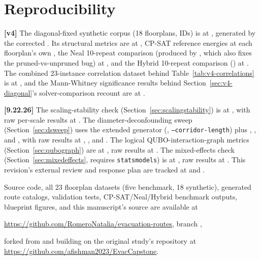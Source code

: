 \documentclass[11pt]{article}
\begin{document}
\section{Reproducibility}
\textbf{[v4]} The diagonal-fixed synthetic corpus (18 floorplans,  IDs) is at , generated by the corrected . Its structural metrics are at , CP-SAT reference energies at each floorplan's own , the Neal 10-repeat comparison (produced by , which also fixes the pruned-vs-unpruned bug) at , and the Hybrid 10-repeat comparison () at . The combined 23-instance correlation dataset behind Table~\ref{tab:v4-correlations} is at , and the Mann-Whitney significance results behind Section~\ref{sec:v4-diagonal}'s solver-comparison recount are at .

\textbf{[9.22.26]} The scaling-stability check (Section~\ref{sec:scalingstability}) is at , with raw per-scale results at . The diameter-deconfounding sweep (Section~\ref{sec:dsweep}) uses the extended generator (, \texttt{--corridor-length}) plus , , and , with raw results at , , and . The logical QUBO-interaction-graph metrics (Section~\ref{sec:qubograph}) are at , raw results at . The mixed-effects check (Section~\ref{sec:mixedeffects}, requires \texttt{statsmodels}) is at , raw results at . This revision's external review and response plan are tracked at  and .

Source code, all 23 floorplan datasets (five benchmark, 18 synthetic), generated route catalogs, validation tests, CP-SAT/Neal/Hybrid benchmark outputs, blueprint figures, and this manuscript's source are available at
\begin{center}
\url{https://github.com/RomeroNatalia/evacuation-routes}, branch ,
\end{center}
forked from and building on the original study's repository at \url{https://github.com/afishman2023/EvacCapstone}.
\end{document}
